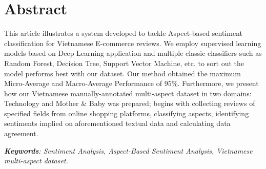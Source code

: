 \chapter*{Abstract}

This article illustrates a system developed to tackle Aspect-based sentiment classification for Vietnamese E-commerce reviews. We employ supervised learning models based on Deep Learning application and multiple classic classifiers such as Random Forest, Decision Tree, Support Vector Machine, etc. to sort out the model performs best with our dataset. Our method obtained the maximum Micro-Average and Macro-Average Performance of $95\%$. Furthermore, we present how our Vietnamese manually-annotated multi-aspect dataset in two domains: Technology and Mother \& Baby was prepared; begins with collecting reviews of specified fields from online shopping platforms, classifying aspects, identifying sentiments implied on aforementioned textual data and calculating data agreement.

\vspace{8pt}
\noindent \textit{\textbf{Keywords}: Sentiment Analysis, Aspect-Based Sentiment Analysis, Vietnamese multi-aspect dataset.}

